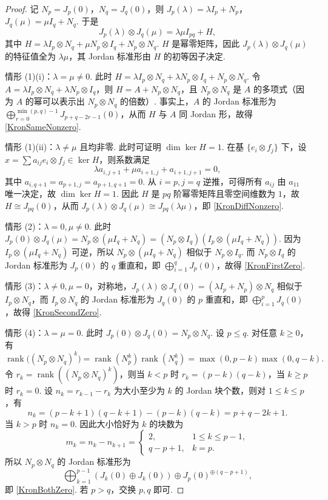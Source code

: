 \documentclass[../../main.tex]{subfiles}%
\begin{document}
\begin{proof}
记 $N_p=J_p(0)$，$N_q=J_q(0)$，则 $J_p(\lambda)=\lambda I_p+N_p$，$J_q(\mu)=\mu I_q+N_q$. 于是
\[
J_p(\lambda)\otimes J_q(\mu)=\lambda\mu I_{pq}+H,
\]
其中 $H=\lambda I_p\otimes N_q+\mu N_p\otimes I_q+N_p\otimes N_q$. $H$ 是幂零矩阵，因此 $J_p(\lambda)\otimes J_q(\mu)$ 的特征值全为 $\lambda\mu$，其 Jordan 标准形由 $H$ 的初等因子决定.

情形 (1)(i)：$\lambda=\mu\neq 0$. 此时 $H=\lambda I_p\otimes N_q+\lambda N_p\otimes I_q+N_p\otimes N_q$. 令 $A=\lambda I_p\otimes N_q+\lambda N_p\otimes I_q$，则 $H=A+N_p\otimes N_q$，且 $N_p\otimes N_q$ 是 $A$ 的多项式（因为 $A$ 的幂可以表示出 $N_p\otimes N_q$ 的倍数）. 事实上，$A$ 的 Jordan 标准形为 $\bigoplus_{r=0}^{\min(p,q)-1} J_{p+q-2r-1}(0)$，从而 $H$ 与 $A$ 同 Jordan 形，故得 \eqref{KronSameNonzero}.

情形 (1)(ii)：$\lambda\neq \mu$ 且均非零. 此时可证明 $\dim\ker H=1$. 在基 $\{e_i\otimes f_j\}$ 下，设 $x=\sum a_{ij} e_i\otimes f_j\in\ker H$，则系数满足
\[
\lambda a_{i,j+1}+\mu a_{i+1,j}+a_{i+1,j+1}=0,
\]
其中 $a_{i,q+1}=a_{p+1,j}=a_{p+1,q+1}=0$. 从 $i=p,j=q$ 逆推，可得所有 $a_{ij}$ 由 $a_{11}$ 唯一决定，故 $\dim\ker H=1$. 因此 $H$ 是 $pq$ 阶幂零矩阵且零空间维数为 $1$，故 $H\cong J_{pq}(0)$，从而 $J_p(\lambda)\otimes J_q(\mu)\cong J_{pq}(\lambda\mu)$，即 \eqref{KronDiffNonzero}.

情形 (2)：$\lambda=0,\mu\neq 0$. 此时 $J_p(0)\otimes J_q(\mu)=N_p\otimes (\mu I_q+N_q)=(N_p\otimes I_q)(I_p\otimes(\mu I_q+N_q))$. 因为 $I_p\otimes(\mu I_q+N_q)$ 可逆，所以 $N_p\otimes (\mu I_q+N_q)$ 相似于 $N_p\otimes I_q$. 而 $N_p\otimes I_q$ 的 Jordan 标准形为 $J_p(0)$ 的 $q$ 重直和，即 $\bigoplus_{i=1}^{q} J_p(0)$，故得 \eqref{KronFirstZero}.

情形 (3)：$\lambda\neq 0,\mu=0$，对称地，$J_p(\lambda)\otimes J_q(0)=(\lambda I_p+N_p)\otimes N_q$ 相似于 $I_p\otimes N_q$，而 $I_p\otimes N_q$ 的 Jordan 标准形为 $J_q(0)$ 的 $p$ 重直和，即 $\bigoplus_{i=1}^{p} J_q(0)$，故得 \eqref{KronSecondZero}.

情形 (4)：$\lambda=\mu=0$. 此时 $J_p(0)\otimes J_q(0)=N_p\otimes N_q$. 设 $p\leqslant q$. 对任意 $k\geqslant 0$，有
\[
\operatorname{rank}\big((N_p\otimes N_q)^k\big)=\operatorname{rank}(N_p^k)\operatorname{rank}(N_q^k)=\max(0,p-k)\max(0,q-k).
\]
令 $r_k=\operatorname{rank}((N_p\otimes N_q)^k)$，则当 $k<p$ 时 $r_k=(p-k)(q-k)$，当 $k\geqslant p$ 时 $r_k=0$. 设 $n_k=r_{k-1}-r_k$ 为大小至少为 $k$ 的 Jordan 块个数，则对 $1\leqslant k\leqslant p$，有
\[
n_k=(p-k+1)(q-k+1)-(p-k)(q-k)=p+q-2k+1.
\]
当 $k>p$ 时 $n_k=0$. 因此大小恰好为 $k$ 的块数为
\[
m_k=n_k-n_{k+1}=
\begin{cases}
2, & 1\leqslant k\leqslant p-1,\\
q-p+1, & k=p.
\end{cases}
\]
所以 $N_p\otimes N_q$ 的 Jordan 标准形为
\[
\bigoplus_{k=1}^{p-1}(J_k(0)\oplus J_k(0)) \oplus J_p(0)^{\oplus (q-p+1)},
\]
即 \eqref{KronBothZero}. 若 $p>q$，交换 $p,q$ 即可.
\end{proof}
\end{document}

